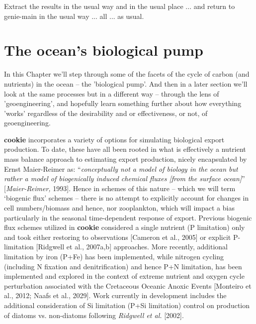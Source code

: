 \vspace{2mm}
\noindent Extract the results in the usual way and in the usual place ... and return to \textsf{\footnotesize genie-main} in the usual way ... all ... as usual.

\newpage

\section*{The ocean's biological pump}

In this Chapter we'll step through some of the facets of the cycle of carbon (and nutrients) in the ocean -- the 'biological pump'. And then in a later section we'll look at the same processes but in a different way -- through the lens of 'geoengineering', and hopefully learn something further about how everything 'works' regardless of the desirability and or effectiveness, or not, of geoengineering.

\textbf{cookie} incorporates a variety of options for simulating biological export production. To date, these have all been rooted in what is effectively a nutrient mass balance approach to estimating export production, nicely encapsulated by Ernst Maier-Reimer as: “\textit{conceptually not a model of biology in the ocean but rather a model of biogenically induced chemical fluxes [from the surface ocean]}” [\textit{Maier-Reimer,} 1993]. Hence in schemes of this nature -- which we will term ‘biogenic  flux’ schemes --  there is no attempt to explicitly account for changes in cell numbers/biomass and hence, nor zooplankton, which will impact a bias particularly in the seasonal time-dependent response of export. Previous biogenic flux schemes utilized in  \textbf{cookie}  considered a single nutrient (P limitation) only and took either restoring to observations [Cameron et al., 2005] or explicit P-limitation [Ridgwell et al., 2007a,b] approaches. More recently, additional limitation by iron (P+Fe) has been implemented, while nitrogen cycling (including N fixation and denitrification) and hence P+N limitation, has been implemented and explored in the context of extreme nutrient and oxygen cycle perturbation associated with the Cretaceous Oceanic Anoxic Events [Monteiro et al., 2012; Naafs et al., 2029]. Work currently in development includes the additional consideration of Si limitation (P+Si limitation) control on production of diatoms vs. non-diatoms following \textit{Ridgwell et al.} [2002].

